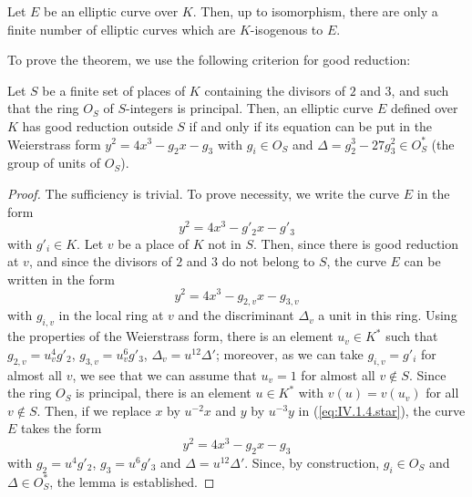 \begin{corollary}
Let $E$ be an elliptic curve over $K$.  Then, up to isomorphism, there
are only a finite number of elliptic curves which are $K$-isogenous to
$E$.
\end{corollary}

To prove the theorem, we use the following criterion for good
reduction:

\begin{lemma}
Let $S$ be a finite set of places of $K$ containing the divisors of
$2$ and $3$, and such that the ring $O_S$ of $S$-integers is
principal.  Then, an elliptic curve $E$ defined over $K$ has good
reduction outside $S$ if and only if its equation can be put in the
Weierstrass form $y^2 = 4x^3 - g_2x - g_3$ with $g_i \in O_S$ and
$\Delta = g_2^3 - 27g_3^2 \in O_S^*$ (the group of units of $O_S$).
\end{lemma}

\begin{proof}
The sufficiency is trivial.  To prove necessity, we write the curve
$E$ in the form
\begin{equation}\tag{$*$}\label{eq:IV.1.4.star}
y^2 = 4x^3 - g'_2x - g'_3
\end{equation}
with $g'_i \in K$.  Let $v$ be a place of $K$ not in $S$.  Then, since
there is good reduction at $v$, and since the divisors of $2$ and $3$
do not belong to $S$, the curve $E$ can be written in the form
\[
y^2 = 4x^3 - g_{2,v}x - g_{3,v}
\]
with $g_{i,v}$ in the local ring at $v$ and the discriminant
$\Delta_v$ a unit in this ring.  Using the properties of the
Weierstrass form, there is an element $u_v \in K^*$ such that
$g_{2,v} = u_v^4g'_2$, $g_{3,v} = u_v^6g'_3$, $\Delta_v =
u^{12}\Delta'$;
moreover, as we can take $g_{i,v} = g'_i$ for almost all $v$, we see
that we can assume that $u_v = 1$ for almost all $v \notin S$.  Since
the ring $O_S$ is principal, there is an element $u \in K^*$ with
$v(u) = v(u_v)$ for all $v \notin S$.  Then, if we replace $x$ by
$u^{-2}x$ and $y$ by $u^{-3}y$ in (\ref{eq:IV.1.4.star}), the curve
$E$ takes the form
\[
y^2 = 4x^3 - g_2x - g_3
\]
with $g_2 = u^4g'_2$, $g_3 = u^6g'_3$ and $\Delta = u^{12}\Delta'$.
Since, by construction, $g_i \in O_S$ and $\Delta \in O_S^*$, the
lemma is established.
\end{proof}

